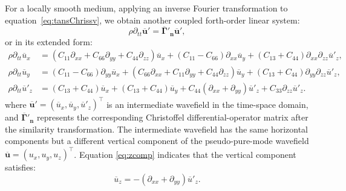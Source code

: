 For a locally smooth medium, applying an inverse Fourier transformation to
equation~\ref{eq:tansChrissv}, we obtain another coupled
forth-order linear system:
\begin{equation}
\label{eq:tansElasticsv}
\rho\partial_{tt}{\overline{\mathbf{u}}}'={\overline{\mathbf{\Gamma}}}'_\mathbf{n}{\overline{\mathbf{u}}}',
\end{equation}
or in its extended form:
\begin{equation}
\label{eq:pseudosv}
\begin{split}
	\rho\partial_{tt}\overline{u}_x&=(C_{11}\partial_{xx}+C_{66}\partial_{yy}+ C_{44}\partial_{zz}){\overline{u}_x}
	+(C_{11}-C_{66})\partial_{xx}{\overline{u}_y} 
	+(C_{13}+C_{44})\partial_{xx}\partial_{zz}{{\overline{u}}'_z}, \\
	\rho\partial_{tt}\overline{u}_y&=(C_{11}-C_{66})\partial_{yy}{\overline{u}_x}
	+ (C_{66}\partial_{xx}+C_{11}\partial_{yy}+C_{44}\partial_{zz}){\overline{u}_y}
	+(C_{13}+C_{44})\partial_{yy}\partial_{zz}{{\overline{u}}'_z}, \\
	\rho\partial_{tt}{\overline{u}}'_z&=(C_{13}+C_{44})\overline{u}_x
	+(C_{13}+C_{44})\overline{u}_y
	+C_{44}(\partial_{xx}+\partial_{yy})\overline{u}'_z+C_{33}\partial_{zz}{\overline{u}}'_z.
\end{split}
\end{equation}
where
${\overline{\mathbf{u}}}'=(\overline{u}_x,\overline{u}_y,{\overline{u}}'_z)^{\top}$
is an intermediate wavefield in the time-space domain, and
${\overline{\mathbf{\Gamma}}}'_\mathbf{n}$
 represents the corresponding Christoffel differential-operator matrix after the similarity
 transformation.
 The intermediate wavefield has the same horizontal components but a different vertical
 component of the pseudo-pure-mode wavefield $\overline{\mathbf{u}}=(u_x, u_y,
 u_z)^{\top}$.
 Equation \ref{eq:zcomp} indicates that the vertical component satisfies:
\begin{equation}
\label{eq:zcomp1}
\overline{u}_z=-(\partial_{xx}+\partial_{yy}){\overline{u}}'_z.
\end{equation}

